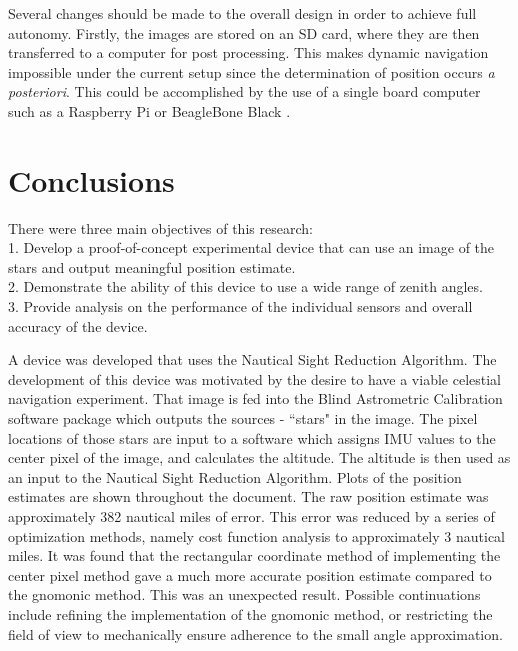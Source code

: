 \documentclass[12pt,a4paper]{book}
\begin{document}
Several changes should be made to the overall design in order to achieve full autonomy. Firstly, the images are stored on an SD card, where they are then transferred to a computer for post processing.  This makes dynamic navigation impossible under the current setup since the determination of position occurs \textit{a posteriori}.  This could be accomplished by the use of a single board computer such as a Raspberry Pi \cite{b:rasp} or BeagleBone Black \cite{b:bb}.

\chapter{Conclusions}
There were three main objectives of this research:
\\
1.  Develop a proof-of-concept experimental device that can use an image of the stars and output meaningful position estimate.
\\
2.  Demonstrate the ability of this device to use a wide range of zenith angles.  
\\
3.  Provide analysis on the performance of the individual sensors and overall accuracy of the device.

A device was developed that uses the Nautical Sight Reduction Algorithm.  The development of this device was motivated by the desire to have a viable celestial navigation experiment.  
That image is fed into the Blind Astrometric Calibration software package which outputs the sources - ``stars" in the image.  The pixel locations of those stars are input to a software which assigns IMU values to the center pixel of the image, and calculates the altitude.  The altitude is then used as an input to the Nautical Sight Reduction Algorithm.  Plots of the position estimates are shown throughout the document.  The raw position estimate was approximately 382 nautical miles of error.  This error was reduced by a series of optimization methods, namely cost function analysis to approximately 3 nautical miles.  It was found that the rectangular coordinate method of implementing the center pixel method gave a much more accurate position estimate compared to the gnomonic method.  This was an unexpected result.  Possible continuations include refining the implementation of the gnomonic method, or restricting the field of view to mechanically ensure adherence to the small angle approximation.  
\end{document}
